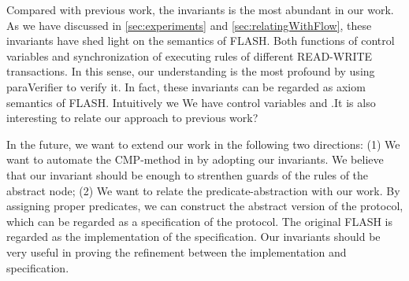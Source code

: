 \documentclass{llncs}
\begin{document}
 Compared with previous work, the invariants   is the most abundant in our work. As we have discussed in \ref{sec:experiments} and \ref{sec:relatingWithFlow}, these invariants have shed light on the semantics of FLASH. Both functions of control variables and synchronization of executing rules of different  READ-WRITE transactions. In this sense,  our understanding  is the most profound by using {\sf paraVerifier} to verify it. In fact, these invariants can be regarded as axiom semantics of FLASH. Intuitively we We have control variables and .It is also interesting to relate our approach to previous work?

 In the future, we want to extend our work in the following two directions: (1) We want to automate the CMP-method in \cite{Chou2004} by adopting our invariants. We believe that our invariant should be enough to strenthen   guards of the rules of the abstract node; (2) We want to relate the predicate-abstraction with our work. By assigning proper predicates, we can construct the abstract version of the protocol, which can be regarded as a specification of the protocol. The original FLASH is regarded as the implementation of the specification. Our invariants should be very useful in proving the refinement between the implementation and specification.



\end{document}
